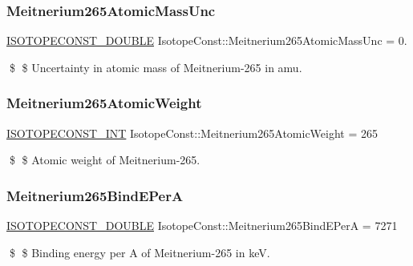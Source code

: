 \subsubsection{\texorpdfstring{Meitnerium265\+Atomic\+Mass\+Unc}{Meitnerium265AtomicMassUnc}}
{\footnotesize\ttfamily \mbox{\hyperlink{group___isotope_const-_macros_ga8f45a7272ce02c0b4c65c44636ed719a}{I\+S\+O\+T\+O\+P\+E\+C\+O\+N\+S\+T\+\_\+\+D\+O\+U\+B\+LE}} Isotope\+Const\+::\+Meitnerium265\+Atomic\+Mass\+Unc = 0.}

\$ \$ Uncertainty in atomic mass of Meitnerium-\/265 in amu. \mbox{\label{group___isotope_const-_meitnerium-_mt265_ga93a890b7a2dc9a064c702d9326fd5a0f}} 
\subsubsection{\texorpdfstring{Meitnerium265\+Atomic\+Weight}{Meitnerium265AtomicWeight}}
{\footnotesize\ttfamily \mbox{\hyperlink{group___isotope_const-_macros_ga5f18360b3e99483a35c32d789e62621c}{I\+S\+O\+T\+O\+P\+E\+C\+O\+N\+S\+T\+\_\+\+I\+NT}} Isotope\+Const\+::\+Meitnerium265\+Atomic\+Weight = 265}

\$ \$ Atomic weight of Meitnerium-\/265. \mbox{\label{group___isotope_const-_meitnerium-_mt265_ga3f155a652bf2a49ae3f38b1d1452423b}} 
\subsubsection{\texorpdfstring{Meitnerium265\+Bind\+E\+PerA}{Meitnerium265BindEPerA}}
{\footnotesize\ttfamily \mbox{\hyperlink{group___isotope_const-_macros_ga8f45a7272ce02c0b4c65c44636ed719a}{I\+S\+O\+T\+O\+P\+E\+C\+O\+N\+S\+T\+\_\+\+D\+O\+U\+B\+LE}} Isotope\+Const\+::\+Meitnerium265\+Bind\+E\+PerA = 7271}

\$ \$ Binding energy per A of Meitnerium-\/265 in keV. \mbox{\label{group___isotope_const-_meitnerium-_mt265_ga4679a5b4d7aac832826ac040e1c5f283}} 
